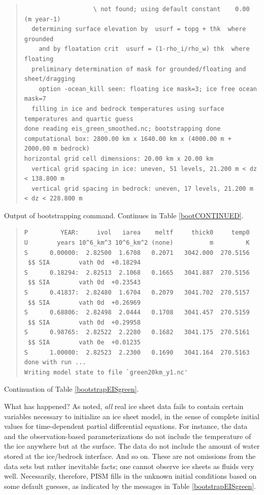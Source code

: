 \documentclass[11pt,final]{amsart}
\begin{document}
\begin{table}
\begin{quote}
\begin{verbatim}
                   \ not found; using default constant    0.00 (m year-1)
  determining surface elevation by  usurf = topg + thk  where grounded
    and by floatation crit  usurf = (1-rho_i/rho_w) thk  where floating
  preliminary determination of mask for grounded/floating and sheet/dragging
    option -ocean_kill seen: floating ice mask=3; ice free ocean mask=7
  filling in ice and bedrock temperatures using surface temperatures and quartic guess
done reading eis_green_smoothed.nc; bootstrapping done
computational box: 2800.00 km x 1640.00 km x (4000.00 m + 2000.00 m bedrock)
horizontal grid cell dimensions: 20.00 km x 20.00 km
  vertical grid spacing in ice: uneven, 51 levels, 21.200 m < dz < 138.800 m
  vertical grid spacing in bedrock: uneven, 17 levels, 21.200 m < dz < 228.800 m
\end{verbatim}
\end{quote}
\normalsize
\bigskip

\caption{Output of bootstrapping command.  Continues in Table \ref{bootCONTINUED}.}
\label{bootstrapEISgreen}
\end{table}

\begin{table}
\scriptsize
\begin{quote}
\begin{verbatim}
P         YEAR:     ivol   iarea    meltf     thick0     temp0
U        years 10^6_km^3 10^6_km^2 (none)          m         K
S      0.00000:  2.82500  1.6708   0.2071   3042.000  270.5156
 $$ SIA        vath 0d  +0.18294
S      0.18294:  2.82513  2.1068   0.1665   3041.887  270.5156
 $$ SIA        vath 0d  +0.23543
S      0.41837:  2.82480  1.6704   0.2079   3041.702  270.5157
 $$ SIA        vath 0d  +0.26969
S      0.68806:  2.82498  2.0444   0.1708   3041.457  270.5159
 $$ SIA        vath 0d  +0.29958
S      0.98765:  2.82522  2.2280   0.1682   3041.175  270.5161
 $$ SIA        vath 0e  +0.01235
S      1.00000:  2.82523  2.2300   0.1690   3041.164  270.5163
done with run ... 
Writing model state to file `green20km_y1.nc'
\end{verbatim}
\end{quote}
\normalsize
\bigskip

\caption{Continuation of Table \ref{bootstrapEISgreen}.}
\label{bootCONTINUED}
\end{table}

What has happened?  As noted, \emph{all} real ice sheet data fails to contain certain variables necessary to initialize an ice sheet model, in the sense of complete initial values for time-dependent partial differential equations.  For instance, the data and the observation-based parameterizations do not include the temperature of the ice anywhere but at the surface.  The data do not include the amount of water stored at the ice/bedrock interface.  And so on.  These are not omissions from the data sets but rather inevitable facts; one cannot observe ice sheets as fluids very well.  Necessarily, therefore, PISM fills in the unknown initial conditions based on some default guesses, as indicated by the messages in Table \ref{bootstrapEISgreen}.
\end{document}
